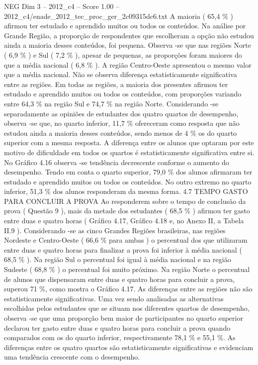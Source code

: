 \begin{textsample}{NEG Dim 3 – 2012\_c4 – Score 1.00 – 2012\_c4/enade\_2012\_tec\_proc\_ger\_2c09315dc6.txt}
A maioria ( 65,4 \% ) afirmou ter estudado e aprendido muitos ou todos os conteúdos.
Na análise por Grande Região, a proporção de respondentes que escolheram a opção não estudou ainda a maioria desses conteúdos, foi pequena.
Observa -se que nas regiões Norte ( 6,9 \% ) e Sul ( 7,2 \% ), apesar de pequenas, as proporções foram maiores do que a média nacional ( 6,8 \% ).
A região Centro-Oeste apresentou o mesmo valor que a média nacional.
Não se observa diferença estatisticamente significativa entre as regiões.
Em todas as regiões, a maioria dos presentes afirmou ter estudado e aprendido muitos ou todos os conteúdos, com proporções variando entre 64,3 \% na região Sul e 74,7 \% na região Norte.
Considerando -se separadamente as opiniões de estudantes dos quatro quartos de desempenho, observa -se que, no quarto inferior, 11,7 \% ofereceram como resposta que não estudou ainda a maioria desses conteúdos, sendo menos de 4 \% os do quarto superior com a mesma resposta.
A diferença entre os alunos que optaram por este motivo de dificuldade em todos os quartos é estatisticamente significativa entre si.
No Gráfico 4.16 observa -se tendência decrescente conforme o aumento do desempenho.
Tendo em conta o quarto superior, 79,0 \% dos alunos afirmaram ter estudado e aprendido muitos ou todos os conteúdos.
No outro extremo no quarto inferior, 51,3 \% dos alunos responderam da mesma forma. 4.7 TEMPO GASTO PARA CONCLUIR A PROVA Ao responderem sobre o tempo de conclusão da prova ( Questão 9 ), mais da metade dos estudantes ( 68,5 \% ) afirmou ter gasto entre duas e quatro horas ( Gráfico 4.17, Gráfico 4.18 e, no Anexo II, a Tabela II.9 ).
Considerando -se as cinco Grandes Regiões brasileiras, nas regiões Nordeste e Centro-Oeste ( 66,6 \% para ambas ) o percentual dos que utilizaram entre duas e quatro horas para finalizar a prova foi inferior à média nacional ( 68,5 \% ).
Na região Sul o percentual foi igual à média nacional e na região Sudeste ( 68,8 \% ) o percentual foi muito próximo.
Na região Norte o percentual de alunos que dispensaram entre duas e quatro horas para concluir a prova, superou 71 \%, como mostra o Gráfico 4.17.
As diferenças entre as regiões não são estatisticamente significativas.
Uma vez sendo analisadas as alternativas escolhidas pelos estudantes que se situam nos diferentes quartos de desempenho, observa -se que uma proporção bem maior de participantes no quarto superior declarou ter gasto entre duas e quatro horas para concluir a prova quando comparados com os do quarto inferior, respectivamente 78,1 \% e 55,1 \%.
As diferenças entre os quatro quartos são estatisticamente significativas e evidenciam uma tendência crescente com o desempenho.

\end{textsample}

